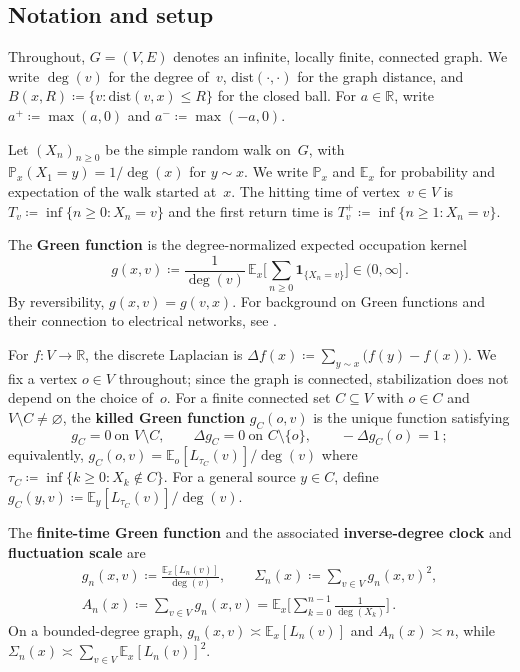 \documentclass[aop]{imsart}
\theoremstyle{plain}
\theoremstyle{definition}
\newcommand{\R}{\mathbb{R}}
\newcommand{\E}{\mathbb{E}}
\renewcommand{\P}{\mathbb{P}}
\newcommand{\one}{\mathbf{1}}
\begin{document}
	\subsection{Notation and setup}
	Throughout, $G=(V,E)$ denotes an infinite, locally finite, connected graph. We write $\deg(v)$ for the degree of~$v$, $\mathrm{dist}(\cdot,\cdot)$ for the graph distance, and $B(x,R)\coloneqq\{v:\mathrm{dist}(v,x)\leq R\}$ for the closed ball. For $a\in\R$, write $a^+\coloneqq\max(a,0)$ and $a^-\coloneqq\max(-a,0)$.
	
	Let $(X_n)_{n\geq 0}$ be the simple random walk on~$G$, with $\P_x(X_1=y)=1/\deg(x)$ for $y\sim x$. We write $\P_x$ and $\E_x$ for probability and expectation of the walk started at~$x$. The hitting time of vertex~$v \in V$ is $T_v\coloneqq\inf\{n\geq 0:X_n=v\}$ and the first return time is $T_v^+\coloneqq\inf\{n\geq 1:X_n=v\}$.
	
	The \textbf{Green function} is the degree-normalized expected occupation kernel
	\begin{equation}\label{eq:green-def}
		g(x,v)\coloneqq\frac{1}{\deg(v)}\,\E_x\biggl[\sum_{n\geq 0}\one_{\{X_n=v\}}\biggr]\in(0,\infty]\,.
	\end{equation}
	By reversibility, $g(x,v)=g(v,x)$. %
	For background on Green functions and their connection to electrical networks, see \citet[Chapter~2]{LP16}.
	
	For $f\colon V\to \R$, the discrete Laplacian is $\Delta f(x) \coloneqq \sum_{y \sim x}\bigl(f(y) - f(x)\bigr)$.
	We fix a vertex $o\in V$ throughout; since the graph is connected, stabilization does not depend on the choice of~$o$. For a finite connected set $C\subseteq V$ with $o\in C$ and $V\setminus C\neq\varnothing$, the \textbf{killed Green function} $g_C(o,v)$ is the unique function satisfying
	\begin{equation}\label{eq:gC-PDE}
		g_C=0\ \text{on }V\setminus C,\qquad \Delta g_C=0\ \text{on }C\setminus\{o\},\qquad -\Delta g_C(o)=1\,;
	\end{equation}
	equivalently, $g_C(o,v)=\E_o[L_{\tau_C}(v)]/\deg(v)$ where $\tau_C\coloneqq\inf\{k\geq 0:X_k\notin C\}$. For a general source $y\in C$, define $g_C(y,v)\coloneqq\E_y[L_{\tau_C}(v)]/\deg(v)$.
	
	The \textbf{finite-time Green function} and the associated \textbf{inverse-degree clock} and \textbf{fluctuation scale} are
	\begin{equation}\label{eq:gn-def}
		\begin{gathered}
			g_n(x,v)\coloneqq\frac{\E_x[L_n(v)]}{\deg(v)},\qquad
			\Sigma_n(x)\coloneqq\sum_{v\in V}g_n(x,v)^2,\\
			A_n(x)\coloneqq\sum_{v\in V}g_n(x,v)=\E_x\biggl[\sum_{k=0}^{n-1}\frac{1}{\deg(X_k)}\biggr]\,.
		\end{gathered}
	\end{equation}
	On a bounded-degree graph, $g_n(x,v)\asymp\E_x[L_n(v)]$ and $A_n(x)\asymp n$, while $\Sigma_n(x)\asymp\sum_{v\in V}\E_x[L_n(v)]^2$.
	
\end{document}
